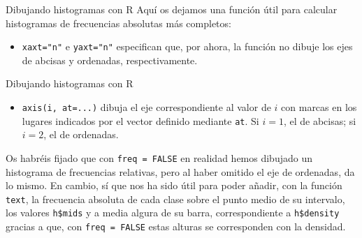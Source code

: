 \documentclass[
  ignorenonframetext,
]{beamer}
\newenvironment{Shaded}{\begin{snugshade}}{\end{snugshade}}
\newcommand{\AttributeTok}[1]{\textcolor[rgb]{0.13,0.29,0.53}{#1}}
\newcommand{\ConstantTok}[1]{\textcolor[rgb]{0.56,0.35,0.01}{#1}}
\newcommand{\ControlFlowTok}[1]{\textcolor[rgb]{0.13,0.29,0.53}{\textbf{#1}}}
\newcommand{\DecValTok}[1]{\textcolor[rgb]{0.00,0.00,0.81}{#1}}
\newcommand{\FunctionTok}[1]{\textcolor[rgb]{0.13,0.29,0.53}{\textbf{#1}}}
\newcommand{\NormalTok}[1]{#1}
\newcommand{\OtherTok}[1]{\textcolor[rgb]{0.56,0.35,0.01}{#1}}
\newcommand{\SpecialCharTok}[1]{\textcolor[rgb]{0.81,0.36,0.00}{\textbf{#1}}}
\newcommand{\StringTok}[1]{\textcolor[rgb]{0.31,0.60,0.02}{#1}}
\providecommand{\tightlist}{%
  \setlength{\itemsep}{0pt}\setlength{\parskip}{0pt}}
\begin{document}
\begin{frame}[fragile]{Dibujando histogramas con R}
\label{dibujando-histogramas-con-r-3}
Aquí os dejamos una función útil para calcular histogramas de
frecuencias absolutas más completos:

\begin{Shaded}
\end{Shaded}

\begin{itemize}
\tightlist
\item
  \texttt{xaxt="n"} e \texttt{yaxt="n"} especifican que, por ahora, la
  función no dibuje los ejes de abcisas y ordenadas, respectivamente.
\end{itemize}
\end{frame}

\begin{frame}[fragile]{Dibujando histogramas con R}
\label{dibujando-histogramas-con-r-4}
\begin{itemize}
\tightlist
\item
  \texttt{axis(i,\ at=...)} dibuja el eje correspondiente al valor de
  \(i\) con marcas en los lugares indicados por el vector definido
  mediante \texttt{at}. Si \(i=1\), el de abcisas; si \(i=2\), el de
  ordenadas.
\end{itemize}

Os habréis fijado que con \texttt{freq\ =\ FALSE} en realidad hemos
dibujado un histograma de frecuencias relativas, pero al haber omitido
el eje de ordenadas, da lo mismo. En cambio, sí que nos ha sido útil
para poder añadir, con la función \texttt{text}, la frecuencia absoluta
de cada clase sobre el punto medio de su intervalo, los valores
\texttt{h\$mids} y a media algura de su barra, correspondiente a
\texttt{h\$density} gracias a que, con \texttt{freq\ =\ FALSE} estas
alturas se corresponden con la densidad.
\end{frame}
\end{document}
